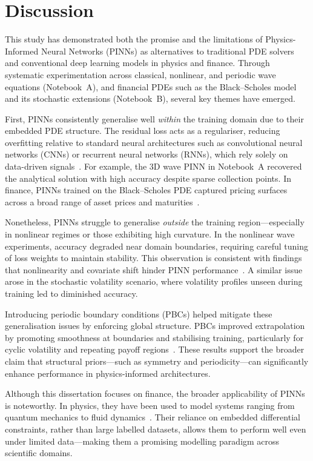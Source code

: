 \documentclass[12pt,a4paper]{article}
\begin{document}
\section{Discussion}

This study has demonstrated both the promise and the limitations of Physics-Informed Neural Networks (PINNs) as alternatives to traditional PDE solvers and conventional deep learning models in physics and finance. Through systematic experimentation across classical, nonlinear, and periodic wave equations (Notebook~A), and financial PDEs such as the Black--Scholes model and its stochastic extensions (Notebook~B), several key themes have emerged.

First, PINNs consistently generalise well \textit{within} the training domain due to their embedded PDE structure. The residual loss acts as a regulariser, reducing overfitting relative to standard neural architectures such as convolutional neural networks (CNNs) or recurrent neural networks (RNNs), which rely solely on data-driven signals~\cite{raissi2019physics}. For example, the 3D wave PINN in Notebook~A recovered the analytical solution with high accuracy despite sparse collection points. In finance, PINNs trained on the Black--Scholes PDE captured pricing surfaces across a broad range of asset prices and maturities~\cite{cuomo2022scientific}.

Nonetheless, PINNs struggle to generalise \textit{outside} the training region—especially in nonlinear regimes or those exhibiting high curvature. In the nonlinear wave experiments, accuracy degraded near domain boundaries, requiring careful tuning of loss weights to maintain stability. This observation is consistent with findings that nonlinearity and covariate shift hinder PINN performance~\cite{wang2022understanding}. A similar issue arose in the stochastic volatility scenario, where volatility profiles unseen during training led to diminished accuracy.

Introducing periodic boundary conditions (PBCs) helped mitigate these generalisation issues by enforcing global structure. PBCs improved extrapolation by promoting smoothness at boundaries and stabilising training, particularly for cyclic volatility and repeating payoff regions~\cite{zhu2022periodic}. These results support the broader claim that structural priors—such as symmetry and periodicity—can significantly enhance performance in physics-informed architectures.

Although this dissertation focuses on finance, the broader applicability of PINNs is noteworthy. In physics, they have been used to model systems ranging from quantum mechanics to fluid dynamics~\cite{trahan2024quantum}. Their reliance on embedded differential constraints, rather than large labelled datasets, allows them to perform well even under limited data—making them a promising modelling paradigm across scientific domains.
\end{document}
